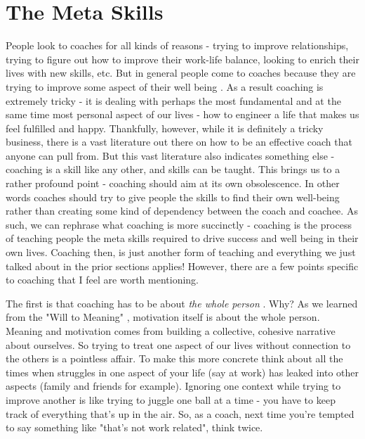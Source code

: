 \documentclass[11pt,a5paper]{book}
\begin{document}
\section{The Meta Skills}
People look to coaches for all kinds of reasons - trying to improve relationships, trying to figure out how to improve their work-life balance, looking to enrich their lives with new skills, etc. But in general people come to coaches because they are trying to improve some aspect of their well being \cite{coactive}. As a result coaching is extremely tricky - it is dealing with perhaps the most fundamental and at the same time most personal aspect of our lives - how to engineer a life that makes us feel fulfilled and happy. Thankfully, however, while it is definitely a tricky business, there is a vast literature out there on how to be an effective coach that anyone can pull from. But this vast literature also indicates something else - coaching is a skill like any other, and skills can be taught. This brings us to a rather profound point - coaching should aim at its own obsolescence. In other words coaches should try to give people the skills to find their own well-being rather than creating some kind of dependency between the coach and coachee. As such, we can rephrase what coaching is more succinctly - coaching is the process of teaching people the meta skills required to drive success and well being in their own lives. Coaching then, is just another form of teaching and everything we just talked about in the prior sections applies! However, there are a few points specific to coaching that I feel are worth mentioning.
\newline

The first is that coaching has to be about \textit{the whole person} \cite{coactive}. Why? As we learned from the "Will to Meaning" \cite{frankl}, motivation itself is about the whole person. Meaning and motivation comes from building a collective, cohesive narrative about ourselves. So trying to treat one aspect of our lives without connection to the others is a pointless affair. To make this more concrete think about all the times when struggles in one aspect of your life (say at work) has leaked into other aspects (family and friends for example). Ignoring one context while trying to improve another is like trying to juggle one ball at a time - you have to keep track of everything that's up in the air. So, as a coach, next time you're tempted to say something like "that's not work related", think twice.
\newline
\end{document}
